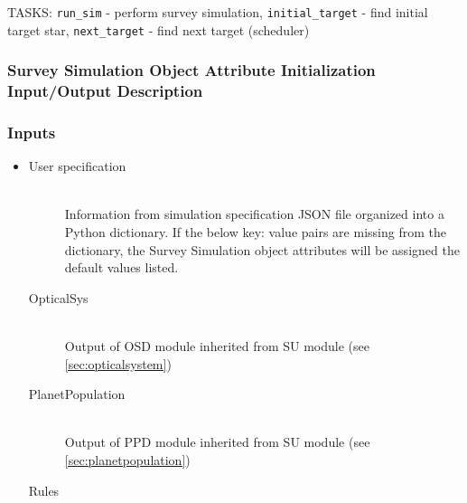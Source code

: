 \documentclass[cleanfoot]{asme2ej}
\begin{document}
TASKS: \verb+run_sim+ - perform survey simulation, \verb+initial_target+ - find initial target star, \verb+next_target+ - find next target (scheduler)

\subsubsection{Survey Simulation Object Attribute Initialization Input/Output Description}
\subsubsection*{Inputs}
\begin{itemize}
    \item 
    \begin{description}
        \item[User specification] \hfill \\
        Information from simulation specification JSON file organized into a Python dictionary. If the below key: value pairs are missing from the dictionary, the Survey Simulation object attributes will be assigned the default values listed.
        \item[OpticalSys] \hfill \\
        Output of OSD module inherited from SU module (see \ref{sec:opticalsystem})
        \item[PlanetPopulation] \hfill \\
        Output of PPD module inherited from SU module (see \ref{sec:planetpopulation})
        \item[Rules] \hfill \\

\end{description}
\end{itemize}
\end{document}
